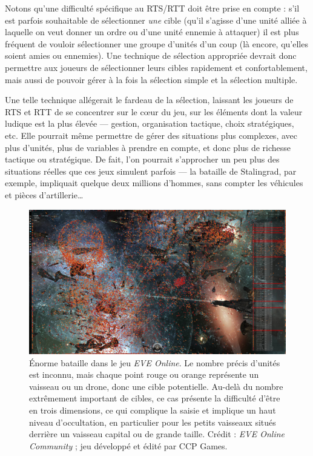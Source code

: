 	Notons qu'une difficulté spécifique au RTS/RTT doit être prise en compte : s'il est parfois souhaitable de sélectionner \emph{une} cible (qu'il s'agisse d'une unité alliée à laquelle on veut donner un ordre ou d'une unité ennemie à attaquer) il est plus fréquent de vouloir sélectionner une groupe d'unités d'un coup (là encore, qu'elles soient amies ou ennemies). Une technique de sélection appropriée devrait donc permettre aux joueurs de sélectionner leurs cibles rapidement et confortablement, mais aussi de pouvoir gérer à la fois la sélection simple et la sélection multiple.
	
	Une telle technique allégerait le fardeau de la sélection, laissant les joueurs de RTS et RTT de se concentrer sur le cœur du jeu, sur les éléments dont la valeur ludique est la plus élevée --- gestion, organisation tactique, choix stratégiques, etc. Elle pourrait même permettre de gérer des situations plus complexes, avec plus d'unités, plus de variables à prendre en compte, et donc plus de richesse tactique ou stratégique. De fait, l'on pourrait s'approcher un peu plus des situations réelles que ces jeux simulent parfois --- la bataille de Stalingrad, par exemple, impliquait quelque deux millions d'hommes, sans compter les véhicules et pièces d'artillerie\ldots{}
	
	\begin{figure}[H]
		\centering
		\includegraphics[width=\textwidth]{figures/ch1/eveonline}
		\caption[Énorme bataille dans le jeu \emph{EVE Online}.]{Énorme bataille dans le jeu \emph{EVE Online}. Le nombre précis d'unités est inconnu, mais chaque point rouge ou orange représente un vaisseau ou un drone, donc une cible potentielle. Au-delà du nombre extrêmement important de cibles, ce cas présente la difficulté d'être en trois dimensions, ce qui complique la saisie et implique un haut niveau d'occultation, en particulier pour les petits vaisseaux situés derrière un vaisseau capital ou de grande taille. Crédit : \emph{EVE Online Community} ; jeu développé et édité par CCP Games.}
		\label{fig:eveonline}
	\end{figure}
	


